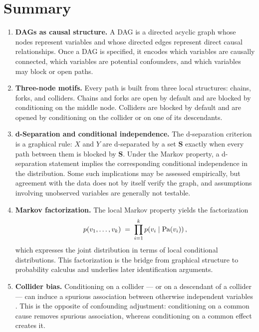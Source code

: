 \documentclass[master.tex]{subfiles}
\begin{document}
\section{Summary}

\begin{enumerate}
  \item \textbf{DAGs as causal structure.}
        A DAG is a directed acyclic graph whose nodes represent variables
        and whose directed edges represent direct causal relationships.
        Once a DAG is specified, it encodes which variables are causally
        connected, which variables are potential confounders, and which
        variables may block or open paths.

  \item \textbf{Three-node motifs.}
        Every path is built from three local structures: chains, forks,
        and colliders.  Chains and forks are open by default and are
        blocked by conditioning on the middle node.  Colliders are blocked
        by default and are opened by conditioning on the collider or on
        one of its descendants.

  \item \textbf{d-Separation and conditional independence.}
        The d-separation criterion is a graphical rule: $X$ and $Y$ are
        d-separated by a set $\mathbf{S}$ exactly when every path between
        them is blocked by $\mathbf{S}$.  Under the Markov property, a
        d-separation statement implies the corresponding conditional
        independence in the distribution.  Some such implications may be
        assessed empirically, but agreement with the data does not by
        itself verify the graph, and assumptions involving unobserved
        variables are generally not testable.

  \item \textbf{Markov factorization.}
        The local Markov property yields the factorization
        \[
          p(v_1,\dots,v_k)
          \;=\;
          \prod_{i=1}^{k} p\!\left(v_i \mid \mathrm{Pa}(v_i)\right),
        \]
        which expresses the joint distribution in terms of local
        conditional distributions.  This factorization is the bridge from
        graphical structure to probability calculus and underlies later
        identification arguments.

  \item \textbf{Collider bias.}
        Conditioning on a collider --- or on a descendant of a collider
        --- can induce a spurious association between otherwise independent
        variables \citep{berkson1946limitations}.  This is the opposite of
        confounding adjustment: conditioning on a common cause removes
        spurious association, whereas conditioning on a common effect
        creates it.


\end{enumerate}
\end{document}
